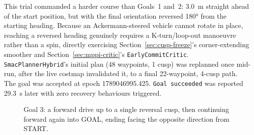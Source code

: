 This trial commanded a harder course than Goals~1 and~2:
\SI{3.0}{\meter} straight ahead of the start position, but with the
final orientation reversed \ang{180} from the starting heading.
Because an Ackermann-steered vehicle cannot rotate in place, reaching
a reversed heading genuinely requires a K-turn/loop-out manoeuvre
rather than a spin, directly exercising Section~\ref{sec:cusp-freeze}'s
corner-extending smoother and Section~\ref{sec:mppi-critic}'s
\texttt{EarlyCommitCritic}. \texttt{SmacPlannerHybrid}'s initial plan
(48 waypoints, 1 cusp) was replanned once mid-run, after the live
costmap invalidated it, to a final 22-waypoint, 4-cusp path. The goal
was accepted at epoch 1789046995.425. \texttt{Goal succeeded} was
reported \SI{29.3}{\second} later with zero recovery behaviours
triggered.

\begin{figure}[htbp]
  \centering
  \caption[Goal 3 approach geometry]{Goal 3: a forward drive up to a single reversal cusp, then continuing forward again into GOAL, ending facing the opposite direction from START.}
  \label{fig:goal3-geometry}
\end{figure}

